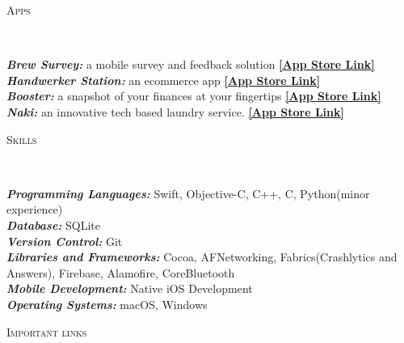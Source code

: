 \documentclass[9pt]{article}
\newenvironment{changemargin}[2]{%
  \begin{list}{}{%
    \setlength{\topsep}{0pt}%
    \setlength{\leftmargin}{#1}%
    \setlength{\rightmargin}{#2}%
    \setlength{\listparindent}{\parindent}%
    \setlength{\itemindent}{\parindent}%
    \setlength{\parsep}{\parskip}%
  }%
  \item[]}{\end{list}
}
\newcommand{\lineover}{
    \begin{changemargin}{-0.05in}{-0.05in}
        \vspace*{-8pt}
        \hrulefill \\
        \vspace*{-2pt}
    \end{changemargin}
}
\newcommand{\header}[1]{
    \begin{changemargin}{-0.5in}{-0.5in}
        \scshape{#1}\\
    \lineover
    \end{changemargin}
}
\newenvironment{body} {
    \vspace*{-16pt}
    \begin{changemargin}{-0.25in}{-0.5in}
  }
    {\end{changemargin}
}
\begin{document}
\smallskip


\header{Apps}

\begin{body}
    \vspace{14pt}
    \emph{\textbf{Brew Survey:}}{} a mobile survey and feedback solution \hfill \href{https://itunes.apple.com/us/app/brew-survey-offline-feedback/id1207197946?mt=8 }{\textbf{ [App Store Link]}}{}\\
    \emph{\textbf{Handwerker Station:}} an ecommerce app \hfill \href{https://itunes.apple.com/us/app/handwerkerstation/id1247972146?mt=8 }{\textbf{ [App Store Link]}}{}\\
    \emph{\textbf{Booster:}}{} a snapshot of your finances at your fingertips \hfill \href{https://itunes.apple.com/nz/app/booster-nz/id1179170506?mt=8}{\textbf{ [App Store Link]}}{}\\
    \emph{\textbf{Naki:}}{} an innovative tech based laundry service. \hfill \href{https://itunes.apple.com/in/app/naki-laundry/id621934237?mt=8}{\textbf{ [App Store Link]}}{}\\
\end{body}

\smallskip


\header{Skills}

\begin{body}
    \vspace{14pt}
    \emph{\textbf{Programming Languages:}}{} Swift, Objective-C, C++, C, Python(minor experience)\\
    \emph{\textbf{Database:}}{} SQLite\\
    \emph{\textbf{Version Control:}}{} Git\\
    \emph{\textbf{Libraries and Frameworks:}}{} Cocoa, AFNetworking, Fabrics(Crashlytics and Answers), Firebase, Alamofire, CoreBluetooth \\
    \emph{\textbf{Mobile Development:}}{} Native iOS Development \\
    \emph{\textbf{Operating Systems:}}{} macOS, Windows\\
\end{body}

\smallskip


\header{Important links}
\end{document}
